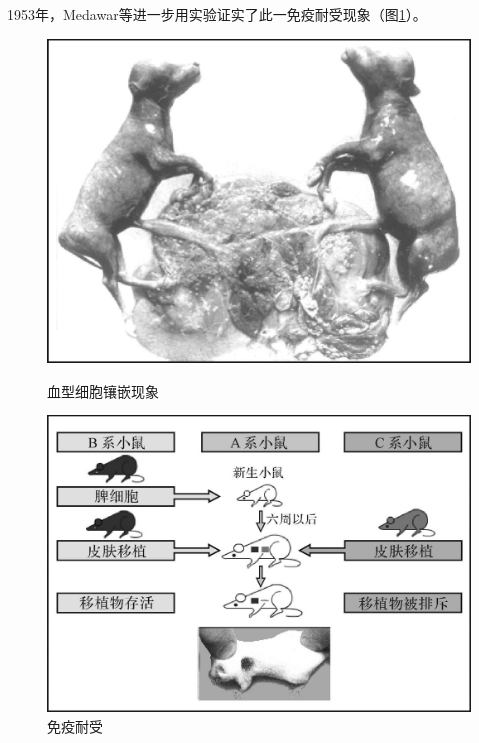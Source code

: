 1953年，Medawar等进一步用实验证实了此一免疫耐受现象（图\ref{fig1-9}）。
\begin{figure}[!htbp]
    \centering
    \begin{minipage}[b]{0.45\textwidth} 
        \includegraphics[height=0.2\textheight]{./images/Image00015.jpg}
        \caption{血型细胞镶嵌现象}
        \label{fig1-8}
    \end{minipage}
\hspace{0.04\textwidth}%
\begin{minipage}[b]{0.45\textwidth} 
    \includegraphics[height=0.2\textheight]{./images/Image00016.jpg}
 \caption{免疫耐受}
 \label{fig1-9}
\end{minipage}
\end{figure} 

